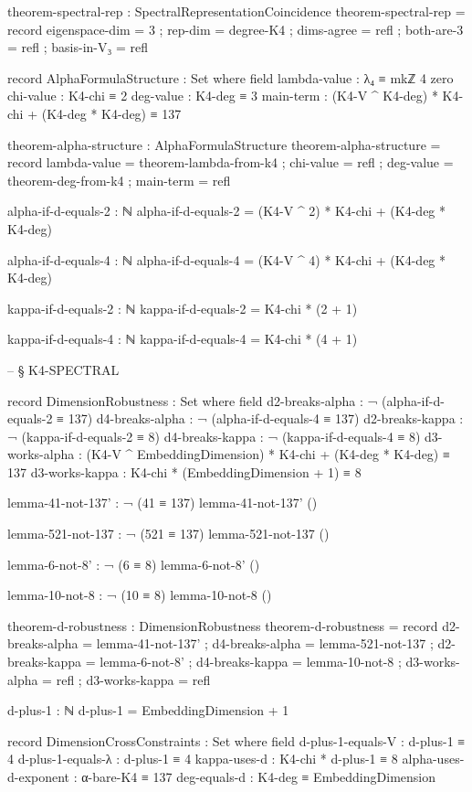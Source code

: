 \documentclass[11pt,a4paper]{book}
\begin{document}
\begin{code}
theorem-spectral-rep : SpectralRepresentationCoincidence
theorem-spectral-rep = record
  { eigenspace-dim = 3
  ; rep-dim        = degree-K4
  ; dims-agree     = refl
  ; both-are-3     = refl
  ; basis-in-V₃    = refl
  }

record AlphaFormulaStructure : Set where
  field
    lambda-value : λ₄ ≡ mkℤ 4 zero
    chi-value    : K4-chi ≡ 2
    deg-value    : K4-deg ≡ 3
    main-term    : (K4-V ^ K4-deg) * K4-chi + (K4-deg * K4-deg) ≡ 137

theorem-alpha-structure : AlphaFormulaStructure
theorem-alpha-structure = record
  { lambda-value = theorem-lambda-from-k4
  ; chi-value = refl
  ; deg-value = theorem-deg-from-k4
  ; main-term = refl
  }

alpha-if-d-equals-2 : ℕ
alpha-if-d-equals-2 = (K4-V ^ 2) * K4-chi + (K4-deg * K4-deg)

alpha-if-d-equals-4 : ℕ
alpha-if-d-equals-4 = (K4-V ^ 4) * K4-chi + (K4-deg * K4-deg)

kappa-if-d-equals-2 : ℕ
kappa-if-d-equals-2 = K4-chi * (2 + 1)

kappa-if-d-equals-4 : ℕ
kappa-if-d-equals-4 = K4-chi * (4 + 1)


-- § K4-SPECTRAL

record DimensionRobustness : Set where
  field
    d2-breaks-alpha  : ¬ (alpha-if-d-equals-2 ≡ 137)
    d4-breaks-alpha  : ¬ (alpha-if-d-equals-4 ≡ 137)
    d2-breaks-kappa  : ¬ (kappa-if-d-equals-2 ≡ 8)
    d4-breaks-kappa  : ¬ (kappa-if-d-equals-4 ≡ 8)
    d3-works-alpha   : (K4-V ^ EmbeddingDimension) * K4-chi + (K4-deg * K4-deg) ≡ 137
    d3-works-kappa   : K4-chi * (EmbeddingDimension + 1) ≡ 8

lemma-41-not-137' : ¬ (41 ≡ 137)
lemma-41-not-137' ()

lemma-521-not-137 : ¬ (521 ≡ 137)
lemma-521-not-137 ()

lemma-6-not-8' : ¬ (6 ≡ 8)
lemma-6-not-8' ()

lemma-10-not-8 : ¬ (10 ≡ 8)
lemma-10-not-8 ()

theorem-d-robustness : DimensionRobustness
theorem-d-robustness = record
  { d2-breaks-alpha  = lemma-41-not-137'
  ; d4-breaks-alpha  = lemma-521-not-137
  ; d2-breaks-kappa  = lemma-6-not-8'
  ; d4-breaks-kappa  = lemma-10-not-8
  ; d3-works-alpha   = refl
  ; d3-works-kappa   = refl
  }

d-plus-1 : ℕ
d-plus-1 = EmbeddingDimension + 1

record DimensionCrossConstraints : Set where
  field
    d-plus-1-equals-V     : d-plus-1 ≡ 4
    d-plus-1-equals-λ     : d-plus-1 ≡ 4
    kappa-uses-d          : K4-chi * d-plus-1 ≡ 8
    alpha-uses-d-exponent : α-bare-K4 ≡ 137
    deg-equals-d          : K4-deg ≡ EmbeddingDimension


\end{code}
\end{document}
